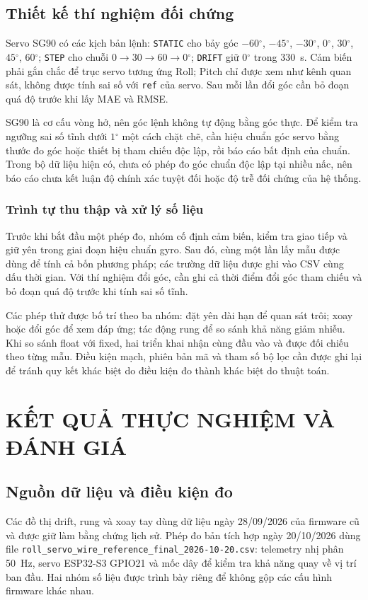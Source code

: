 \documentclass[14pt,a4paper,oneside]{extreport}
\newcommand{\degree}{\ensuremath{^{\circ}}}
\begin{document}
\section{Thiết kế thí nghiệm đối chứng}
Servo SG90 có các kịch bản lệnh: \texttt{STATIC} cho bảy góc $-60\degree$, $-45\degree$, $-30\degree$, $0\degree$, $30\degree$, $45\degree$, $60\degree$; \texttt{STEP} cho chuỗi $0\to30\to60\to0\degree$; \texttt{DRIFT} giữ $0\degree$ trong 330~s. Cảm biến phải gắn chắc để trục servo tương ứng Roll; Pitch chỉ được xem như kênh quan sát, không được tính sai số với \texttt{ref} của servo. Sau mỗi lần đổi góc cần bỏ đoạn quá độ trước khi lấy MAE và RMSE.

SG90 là cơ cấu vòng hở, nên góc lệnh không tự động bằng góc thực. Để kiểm tra ngưỡng sai số tĩnh dưới $1\degree$ một cách chặt chẽ, cần hiệu chuẩn góc servo bằng thước đo góc hoặc thiết bị tham chiếu độc lập, rồi báo cáo bất định của chuẩn. Trong bộ dữ liệu hiện có, chưa có phép đo góc chuẩn độc lập tại nhiều nấc, nên báo cáo chưa kết luận độ chính xác tuyệt đối hoặc độ trễ đối chứng của hệ thống.

\subsection{Trình tự thu thập và xử lý số liệu}
Trước khi bắt đầu một phép đo, nhóm cố định cảm biến, kiểm tra giao tiếp và giữ yên trong giai đoạn hiệu chuẩn gyro. Sau đó, cùng một lần lấy mẫu được dùng để tính cả bốn phương pháp; các trường dữ liệu được ghi vào CSV cùng dấu thời gian. Với thí nghiệm đổi góc, cần ghi cả thời điểm đổi góc tham chiếu và bỏ đoạn quá độ trước khi tính sai số tĩnh.

Các phép thử được bố trí theo ba nhóm: đặt yên dài hạn để quan sát trôi; xoay hoặc đổi góc để xem đáp ứng; tác động rung để so sánh khả năng giảm nhiễu. Khi so sánh float với fixed, hai triển khai nhận cùng đầu vào và được đối chiếu theo từng mẫu. Điều kiện mạch, phiên bản mã và tham số bộ lọc cần được ghi lại để tránh quy kết khác biệt do điều kiện đo thành khác biệt do thuật toán.



\chapter{KẾT QUẢ THỰC NGHIỆM VÀ ĐÁNH GIÁ}

\section{Nguồn dữ liệu và điều kiện đo}
Các đồ thị drift, rung và xoay tay dùng dữ liệu ngày 28/09/2026 của firmware cũ và được giữ làm bằng chứng lịch sử. Phép đo bản tích hợp ngày 20/10/2026 dùng file \texttt{roll\_servo\_wire\_reference\_final\_2026-10-20.csv}: telemetry nhị phân 50~Hz, servo ESP32-S3 GPIO21 và mốc dây để kiểm tra khả năng quay về vị trí ban đầu. Hai nhóm số liệu được trình bày riêng để không gộp các cấu hình firmware khác nhau.
\end{document}
